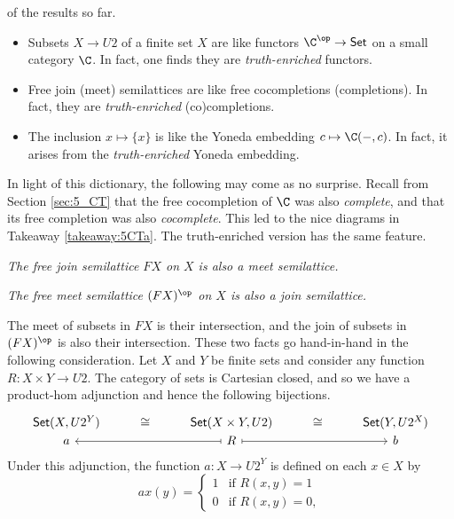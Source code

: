  of the results so far. 
\begin{itemize}
  \item Subsets $X\to U2$ of a finite set $X$ are like functors $\C^{\op}\to \mathsf{Set}$ on a small category $\C$. In fact, one finds they are \textit{truth-enriched} functors.
  \item Free join (meet) semilattices are like free cocompletions (completions). In fact, they are \textit{truth-enriched} (co)completions.
  \item The inclusion $x\mapsto \{x\}$ is like the Yoneda embedding $c\mapsto \C(-,c)$. In fact, it arises from the \textit{truth-enriched} Yoneda embedding.
\end{itemize}
In light of this dictionary, the following may come as no surprise. Recall from Section \ref{sec:5_CT} that the free cocompletion of $\C$ was also \textit{complete}, and that its free completion was also \textit{cocomplete}. This led to the nice diagrams in Takeaway \ref{takeaway:5CTa}. The truth-enriched version has the same feature. 
\begin{description}
  \item \textit{The free join semilattice $FX$ on $X$ is also a meet semilattice.}
  \item \textit{The free meet semilattice $(FX)^{\op}$ on $X$ is also a join semilattice.}
\end{description}
The meet of subsets in $FX$ is their intersection, and the join of subsets in $(FX)^{\op}$ is also their intersection. These two facts go hand-in-hand in the following consideration. Let $X$ and $Y$ be finite sets and consider any function $R\colon X\times Y\to U2$. The category of sets is Cartesian closed, and so we have a product-hom adjunction and hence the following bijections.
\[
  \begin{tikzcd}
  {\mathsf{Set}(X,U2^Y)} & \cong & {\mathsf{Set}(X\times Y,U2)}                 & \cong & {\mathsf{Set}(Y,U2^X)} \\[-20pt]
  a             &       & R \arrow[rr, maps to] \arrow[ll, maps to] &       & b            
  \end{tikzcd}
\]
Under this adjunction, the function $a\colon X\to U2^Y$ is defined on each $x\in X$ by
\begin{equation}\label{eq:ab2}
ax(y)=
\begin{cases}
1 &\text{if $R(x,y)=1$}\\
0 &\text{if $R(x,y)=0$},
\end{cases}
\end{equation}
